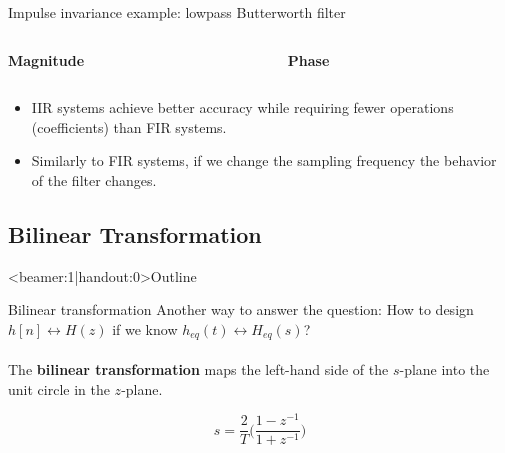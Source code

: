 \documentclass[10pt]{beamer}
\begin{document}
%
\begin{frame}{Impulse invariance example: lowpass Butterworth filter}

\begin{columns}
	\begin{column}{0.5\textwidth}
		\textbf{Magnitude}
		\begin{center}
			\resizebox{\linewidth}{!}{}
		\end{center}
	\end{column}
	\begin{column}{0.5\textwidth}
		\textbf{Phase}
		\begin{center}
			\resizebox{\linewidth}{!}{}
		\end{center}
	\end{column}
\end{columns}

\begin{itemize}
	\item IIR systems achieve better accuracy while requiring fewer operations (coefficients) than FIR systems.
	\item Similarly to FIR systems, if we change the sampling frequency the behavior of the filter changes.
\end{itemize}
\end{frame}

%
\subsection{Bilinear Transformation}
\begin{frame}<beamer:1|handout:0>{Outline} 
\tableofcontents[currentsubsection]
\end{frame}

%
\begin{frame}{Bilinear transformation}
Another way to answer the question: How to design $h[n] \longleftrightarrow H(z)$ if we know $h_{eq}(t) \longleftrightarrow H_{eq}(s)$?
~\\
~\\

The \textbf{bilinear transformation} maps the left-hand side of the $s$-plane into the unit circle in the $z$-plane.
	
\begin{equation*}
	s = \frac{2}{T}\bigg(\frac{1 - z^{-1}}{1 + z^{-1}}\bigg) \tag{Bilinear transformation}
\end{equation*}

\begin{center}
	\resizebox{0.9\linewidth}{!}{}
\end{center}	
\end{frame}
\end{document}
